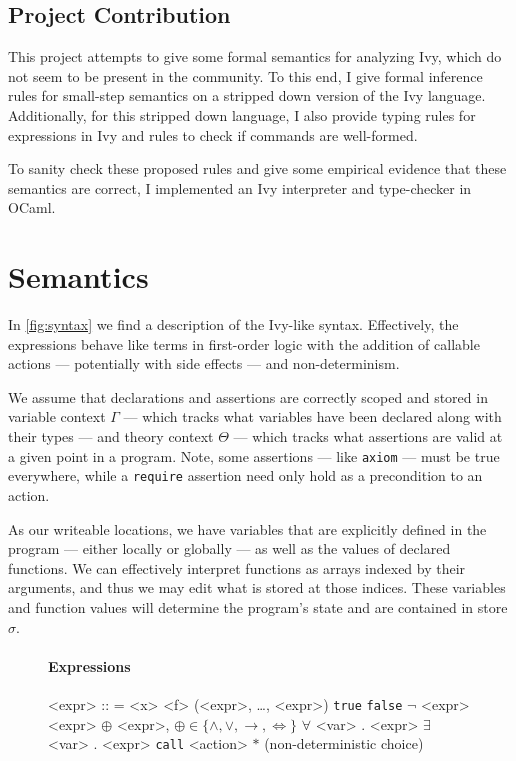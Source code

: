 \documentclass{article}
\begin{document}
\begin{multicols}{2}
    \subsection{Project Contribution}
    This project attempts to give some formal semantics for analyzing Ivy, which do not seem to be present in the community. To this end, I give formal inference rules for small-step semantics on a stripped down version of the Ivy language. Additionally, for this stripped down language, I also provide typing rules for expressions in Ivy and rules to check if commands are well-formed.

    To sanity check these proposed rules and give some empirical evidence that these semantics are correct, I implemented an Ivy interpreter and type-checker in OCaml.

    \section{Semantics}
    In \cref{fig:syntax} we find a description of the Ivy-like syntax. Effectively, the expressions behave like terms in first-order logic with the addition of callable actions --- potentially with side effects --- and non-determinism.

    We assume that declarations and assertions are correctly scoped and stored in variable context $\Gamma$ --- which tracks what variables have been declared along with their types --- and theory context $\Theta$ --- which tracks what assertions are valid at a given point in a program. Note, some assertions --- like \texttt{axiom} --- must be true everywhere, while a \texttt{require} assertion need only hold as a precondition to an action.

    As our writeable locations, we have variables that are explicitly defined in the program --- either locally or globally --- as well as the values of declared functions. We can effectively interpret functions as arrays indexed by their arguments, and thus we may edit what is stored at those indices. These variables and function values will determine the program's state and are contained in store $\sigma$.

    \begin{figure*}
        \begin{multicols}{4}
            \paragraph*{\scriptsize Expressions}
            \begin{grammar}
                \scriptsize
                <expr> :: = <x>
                \alt <f> (<expr>, \dots, <expr>)
                \alt \texttt{true}
                \alt \texttt{false}
                \alt $\neg$ <expr>
                \alt <expr> $\oplus$ <expr>, $\oplus \in \{\land, \lor, \to, \Leftrightarrow\}$
                \alt $\forall$ <var> . <expr>
                \alt $\exists$ <var> . <expr>
                \alt \texttt{call} <action>
                \alt $\ast$ (non-deterministic choice)


\end{grammar}
\end{multicols}
\end{figure*}
\end{multicols}
\end{document}
